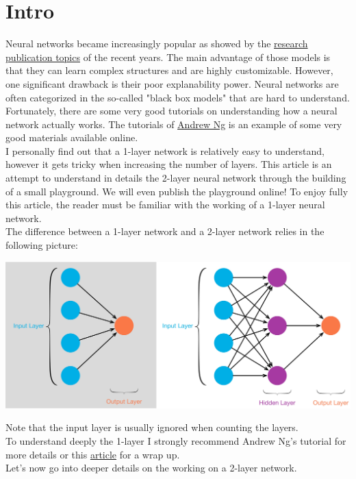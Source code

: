 \section{Intro}

Neural networks became increasingly popular as showed by the \href{https://www.kdnuggets.com/2021/05/winning-machine-learning-competition.html}{research publication topics} of the recent years. The main advantage of those models is that they can learn complex structures and are highly customizable. However, one significant drawback is their poor explanability power. Neural networks are often categorized in the so-called "black box models" that are hard to understand.
Fortunately, there are some very good tutorials on understanding how a neural network actually works. The tutorials of \href{https://www.coursera.org/learn/neural-networks-deep-learning}{Andrew Ng} is an example of some very good materials available online. \\

I personally find out that a 1-layer network is relatively easy to understand, however it gets tricky when increasing the number of layers. This article is an attempt to understand in details the 2-layer neural network through the building of a small playground. We will even publish the playground online! To enjoy fully this article, the reader must be familiar with the working of a 1-layer neural network.\\

The difference between a 1-layer network and a 2-layer network relies in the following picture: \\

\begin{center}
\includegraphics[scale=0.09]{img/nn-layers.jpeg}
\end{center}

Note that the input layer is usually ignored when counting the layers. \\

To understand deeply the 1-layer I strongly recommend Andrew Ng's tutorial for more details or this \href{https://towardsdatascience.com/everything-you-need-to-know-about-neural-networks-and-backpropagation-machine-learning-made-easy-e5285bc2be3a}{article} for a wrap up. \\

Let's now go into deeper details on the working on a 2-layer network.
